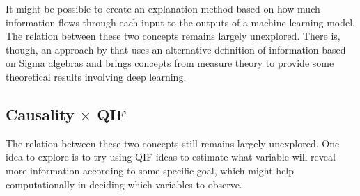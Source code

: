 It might be possible to create an explanation method based on how much information flows through each input to the outputs of a machine learning model. The relation between these two concepts remains largely unexplored. There is, though, an approach by \cite[Part~III]{calin2020deep} that uses an alternative definition of information based on Sigma algebras and brings concepts from measure theory to provide some theoretical results involving deep learning.

\subsection{Causality $\times$ QIF}

The relation between these two concepts still remains largely unexplored. One idea to explore is to try using QIF ideas to estimate what variable will reveal more information according to some specific goal, which might help computationally in deciding which variables to observe.
